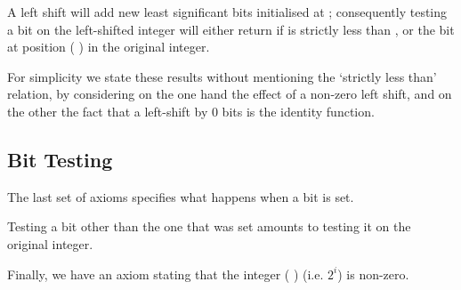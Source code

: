 
A left shift will add  new least significant bits initialised
at ; consequently testing a bit  on the left-shifted
integer will either return  if  is strictly less than
, or the bit at position ( \IdrisFunction{-} )
in the original integer.

For simplicity we state these results without mentioning the `strictly less than'
relation, by considering on the one hand the effect of a non-zero left shift,
and on the other the fact that a left-shift by 0 bits is the identity function.


\subsection{Bit Testing}

The last set of axioms specifies what happens when a bit is set.

Testing a bit other than the one that was set amounts to testing it on the
original integer.


Finally, we have an axiom stating that the integer
( ) (i.e. $2^i$) is non-zero.

